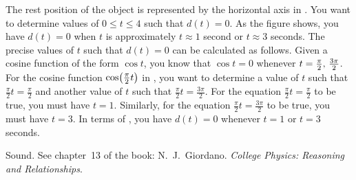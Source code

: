 \documentclass[a4paper,oneside,12pt]{article}
\begin{document}
\begin{problem}
{\begin{solution}
The rest position of the object is represented by the horizontal axis
in .  You want to
determine values of $0 \leq t \leq 4$ such that $d(t) = 0$.  As the
figure shows, you have $d(t) = 0$ when $t$ is approximately
$t \approx 1$ second or $t \approx 3$ seconds.  The precise values of
$t$ such that $d(t) = 0$ can be calculated as follows.  Given a cosine
function of the form $\cos t$, you know that $\cos t = 0$ whenever
$t = {\frac{\pi}{2}},\, {\frac{3\pi}{2}}$.  For the cosine function
$\cosp{\frac{\pi}{2} t}$ in
, you want to
determine a value of $t$ such that $\frac{\pi}{2} t = \frac{\pi}{2}$
and another value of $t$ such that
$\frac{\pi}{2} t = \frac{3\pi}{2}$.  For the equation
$\frac{\pi}{2} t = \frac{\pi}{2}$ to be true, you must have $t = 1$.
Similarly, for the equation $\frac{\pi}{2} t = \frac{3\pi}{2}$ to be
true, you must have $t = 3$.  In terms of
, you have
$d(t) = 0$ whenever $t = 1$ or $t = 3$ seconds.
\end{solution}
}{}

\item Sound.  See chapter~13 of the book:  N.~J.~Giordano.
  \emph{College Physics: Reasoning and Relationships}.
\end{problem}
\end{document}
